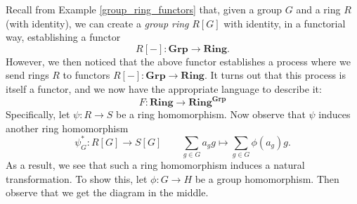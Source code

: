     \begin{example}
        Recall from Example \ref{group_ring_functors} that, given 
        a group $G$ and a ring $R$ (with identity), we can create a 
        \emph{group ring} $R[G]$ with identity, in a functorial way, establishing 
        a functor 
        \[
            R[-]: \textbf{Grp} \to \textbf{Ring}.
        \]  
        However, we then noticed that the above functor establishes a process 
        where we send rings $R$ to functors $R[-]: \textbf{Grp} \to \textbf{Ring}$. 
        It turns out that this process is itself a functor, and we now 
        have the appropriate language to describe it:
        \[
            F: \textbf{Ring} \to \textbf{Ring}^{\textbf{Grp}}
        \]
        Specifically, let $\psi: R \to S$ be a ring homomorphism. 
        Now observe that $\psi$ induces another ring homomorphism 
        \[
            \psi_G^*: R[G] \to S[G] \qquad \sum_{g \in G}a_g g \mapsto \sum_{g \in G}\phi(a_g) g.
        \]
        As a result, we see that such a ring homomorphism induces a natural transformation.
        To show this, let $\phi: G \to H$ be a group homomorphism. Then observe that
        we get the diagram in the middle. 
        \begin{center}
            \hspace{1cm}
            \hspace{1cm}
\end{center}
\end{example}
